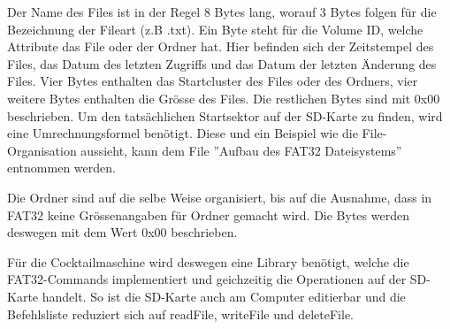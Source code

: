 Der Name des Files ist in der Regel 8 Bytes lang, worauf 3 Bytes folgen für die Bezeichnung der Fileart (z.B .txt). Ein Byte steht für die Volume ID, welche Attribute das File oder der Ordner hat. Hier befinden sich der Zeitstempel des Files, das Datum des letzten Zugriffs und das Datum der letzten Änderung des Files. Vier Bytes enthalten das Startcluster des Files oder des Ordners, vier weitere Bytes enthalten die Grösse des Files. Die restlichen Bytes sind mit 0x00 beschrieben. Um den tatsächlichen Startsektor auf der SD-Karte zu finden, wird eine Umrechnungsformel benötigt. Diese und ein Beispiel wie die File-Organisation aussieht, kann dem File ''Aufbau des FAT32 Dateisystems'' entnommen werden.


Die Ordner sind auf die selbe Weise organisiert, bis auf die Ausnahme, dass in FAT32 keine Grössenangaben für Ordner gemacht wird. Die Bytes werden deswegen mit dem Wert 0x00 beschrieben.

Für die Cocktailmaschine wird deswegen eine Library benötigt, welche die FAT32-Commands implementiert und geichzeitig die Operationen auf der SD-Karte handelt. So ist die SD-Karte auch am Computer editierbar und die Befehlsliste reduziert sich auf readFile, writeFile und deleteFile.